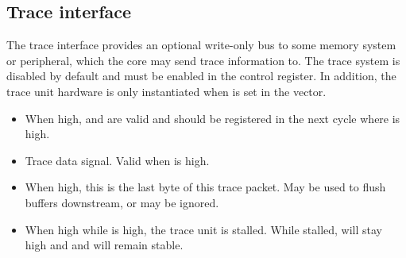 \documentclass[main.tex]{subfiles}
\begin{document}
\subsection{Trace interface}

The trace interface provides an optional write-only bus to some memory system or peripheral, which the core may send trace information to. The trace system is disabled by default and must be enabled in the  control register. In addition, the trace unit hardware is only instantiated when  is set in the  vector.

\begin{itemize}
  
  \item {}
  
  When high,  and  are valid and should be registered in the next cycle where  is high.
  
  \vspace{1em}
  \item {}
  
  Trace data signal. Valid when  is high.
  
  \vspace{1em}
  \item {}
  
  When high, this is the last byte of this trace packet. May be used to flush buffers downstream, or may be ignored.
  
  \vspace{1em}
  \item {}
  
  When high while  is high, the trace unit is stalled. While stalled,  will stay high and  and  will remain stable.
  
\end{itemize}
\end{document}
